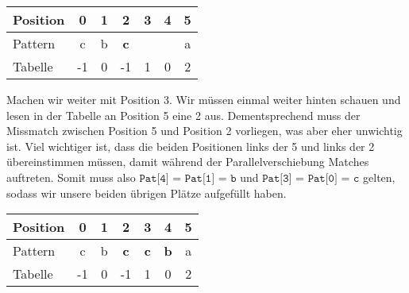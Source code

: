 \documentclass[a4paper, 12pt]{article}
\begin{document}
	\begin{center}
		\begin{tabular}{l|cccccc}
			Position & 0 & 1 & 2 & 3 & 4 & 5 \\  \hline
			Pattern & c & b & \textbf{c} & & & a \\ \hline
			Tabelle & -1 & 0 & -1 & 1 & 0 & 2
		\end{tabular}
	\end{center}

	Machen wir weiter mit Position 3. Wir müssen einmal weiter hinten schauen und lesen in der Tabelle an Position 5 eine 2 aus. Dementsprechend muss der Missmatch zwischen Position 5 und Position 2 vorliegen, was aber eher unwichtig ist. Viel wichtiger ist, dass die beiden Positionen links der 5 und links der 2 übereinstimmen müssen, damit während der Parallelverschiebung Matches auftreten. Somit muss also $\texttt{Pat[4] = Pat[1] = b}$ und $\texttt{Pat[3] = Pat[0] = c}$ gelten, sodass wir unsere beiden übrigen Plätze aufgefüllt haben.
	
	\begin{center}
		\begin{tabular}{l|cccccc}
			Position & 0 & 1 & 2 & 3 & 4 & 5 \\  \hline
			Pattern & c & b & \textbf{c} & \textbf{c} & \textbf{b} & a \\ \hline
			Tabelle & -1 & 0 & -1 & 1 & 0 & 2
		\end{tabular}
	\end{center}
\end{document}
